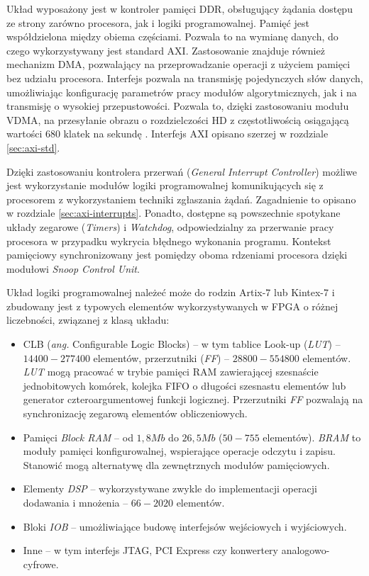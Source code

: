 Układ wyposażony jest w kontroler pamięci DDR, obsługujący żądania dostępu ze strony zarówno procesora, jak i logiki programowalnej. 
Pamięć jest współdzielona między obiema częściami.
Pozwala to na wymianę danych, do czego wykorzystywany jest standard AXI. 
Zastosowanie znajduje również mechanizm DMA, pozwalający na przeprowadzanie operacji z użyciem pamięci bez udziału procesora. 
Interfejs pozwala na transmisję pojedynczych słów danych, umożliwiając konfigurację parametrów pracy modułów algorytmicznych, jak i na transmisję o wysokiej przepustowości. 
Pozwala to, dzięki zastosowaniu modułu VDMA, na przesyłanie obrazu o rozdzielczości HD z częstotliwością osiągającą wartości 680 klatek na sekundę \cite{axi-vdma-guide}. 
Interfejs AXI opisano szerzej w rozdziale \ref{sec:axi-std}.

Dzięki zastosowaniu kontrolera przerwań (\emph{General Interrupt Controller}) możliwe jest wykorzystanie modułów logiki programowalnej komunikujących się z procesorem z wykorzystaniem techniki zgłaszania żądań. Zagadnienie to opisano w rozdziale \ref{sec:axi-interrupts}.
Ponadto, dostępne są powszechnie spotykane układy zegarowe (\emph{Timers}) i \emph{Watchdog}, odpowiedzialny za przerwanie pracy procesora w przypadku wykrycia błędnego wykonania programu.
Kontekst pamięciowy synchronizowany jest pomiędzy oboma rdzeniami procesora dzięki modułowi \emph{Snoop Control Unit}.

Układ logiki programowalnej należeć może do rodzin Artix-7 lub Kintex-7 i zbudowany jest z typowych elementów wykorzystywanych w FPGA o różnej liczebności, związanej z klasą układu:
\begin{itemize}
	\item CLB (\emph{ang.} Configurable Logic Blocks) -- w tym tablice Look-up (\emph{LUT}) -- $14400 - 277400$ elementów, przerzutniki (\emph{FF}) -- $28800 - 554800$ elementów. \emph{LUT} mogą pracować w trybie pamięci RAM zawierającej szesnaście jednobitowych komórek, kolejka FIFO o długości szesnastu elementów lub generator czteroargumentowej funkcji logicznej. Przerzutniki \emph{FF} pozwalają na synchronizację zegarową elementów obliczeniowych.
	
	\item Pamięci \emph{Block RAM} -- od $1,8Mb$ do $26,5Mb$ ($50 - 755$ elementów). \emph{BRAM} to moduły pamięci konfigurowalnej, wspierające operacje odczytu i zapisu. Stanowić mogą alternatywę dla zewnętrznych modułów pamięciowych.
	
	\item Elementy \emph{DSP} -- wykorzystywane zwykle do implementacji operacji dodawania i mnożenia -- $66 - 2020$ elementów.
	
	\item Bloki \emph{IOB} -- umożliwiające budowę interfejsów wejściowych i wyjściowych.
	
	\item Inne -- w tym interfejs JTAG, PCI Express czy konwertery analogowo-cyfrowe.
\end{itemize}


